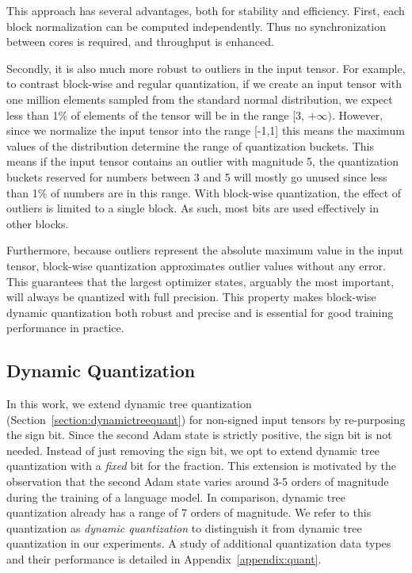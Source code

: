 This approach has several advantages, both for stability and efficiency. First, each block normalization can be computed independently. Thus no synchronization between cores is required, and throughput is enhanced.

Secondly, it is also much more robust to outliers in the input tensor. For example, to contrast block-wise and regular quantization, if we create an input tensor with one million elements sampled from the standard normal distribution, we expect less than 1\% of elements of the tensor will be in the range [3, $+\infty)$. However, since we normalize the input tensor into the range \mbox{[-1,1]} this means the maximum values of the distribution determine the range of quantization buckets. This means if the input tensor contains an outlier with magnitude 5, the quantization buckets reserved for numbers between 3 and 5 will mostly go unused since less than 1\% of numbers are in this range. With block-wise quantization, the effect of outliers is limited to a single block. As such, most bits are used effectively in other blocks.

Furthermore, because outliers represent the absolute maximum value in the input tensor, block-wise quantization approximates outlier values without any error. This guarantees that the largest optimizer states, arguably the most important, will always be quantized with full precision. This property makes block-wise dynamic quantization both robust and precise and is essential for good training performance in practice.

\subsection{Dynamic Quantization}

In this work, we extend dynamic tree quantization (Section~\ref{section:dynamictreequant}) for non-signed input tensors by re-purposing the sign bit. Since the second Adam state is strictly positive, the sign bit is not needed. Instead of just removing the sign bit, we opt to extend dynamic tree quantization with a {\it fixed} bit for the fraction. This extension is motivated by the observation that the second Adam state varies around 3-5 orders of magnitude during the training of a language model. In comparison, dynamic tree quantization already has a range of 7 orders of magnitude. We refer to this quantization as {\em dynamic quantization} to distinguish it from dynamic tree quantization in our experiments. A study of additional quantization data types and their performance is detailed in Appendix~\ref{appendix:quant}.

